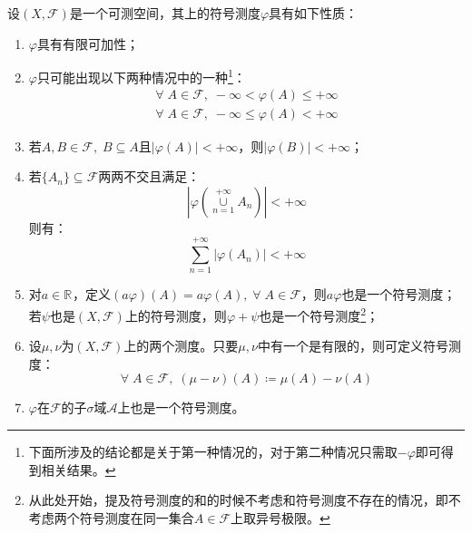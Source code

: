 \begin{property}\label{prop:SignedMeasure}
	设$(X,\mathscr{F})$是一个可测空间，其上的符号测度$\varphi$具有如下性质：
	\begin{enumerate}
		\item $\varphi$具有有限可加性；
		\item $\varphi$只可能出现以下两种情况中的一种\footnote{下面所涉及的结论都是关于第一种情况的，对于第二种情况只需取$-\varphi$即可得到相关结果。}：
		\begin{gather*}
			\forall\;A\in\mathscr{F},\;-\infty<\varphi(A)\leqslant+\infty \\
			\forall\;A\in\mathscr{F},\;-\infty\leqslant\varphi(A)<+\infty
		\end{gather*}
		\item 若$A,B\in\mathscr{F},\;B\subseteq A$且$|\varphi(A)|<+\infty$，则$|\varphi(B)|<+\infty$；
		\item 若$\{A_n\}\subseteq\mathscr{F}$两两不交且满足：
		\begin{equation*}
			\left|\varphi\left(\underset{n=1}{\overset{+\infty}{\cup}}A_n\right)\right|<+\infty
		\end{equation*}
		则有：
		\begin{equation*}
			\sum_{n=1}^{+\infty}|\varphi(A_n)|<+\infty
		\end{equation*}
		\item 对$a\in\mathbb{R}^{}$，定义$(a\varphi)(A)=a\varphi(A),\;\forall\;A\in\mathscr{F}$，则$a\varphi$也是一个符号测度；若$\psi$也是$(X,\mathscr{F})$上的符号测度，则$\varphi+\psi$也是一个符号测度\footnote{从此处开始，提及符号测度的和的时候不考虑和符号测度不存在的情况，即不考虑两个符号测度在同一集合$A\in\mathscr{F}$上取异号极限。}；
		\item 设$\mu,\nu$为$(X,\mathscr{F})$上的两个测度。只要$\mu,\nu$中有一个是有限的，则可定义符号测度：
		\begin{equation*}
			\forall\;A\in\mathscr{F},\;(\mu-\nu)(A)\coloneq\mu(A)-\nu(A)
		\end{equation*}
		\item $\varphi$在$\mathscr{F}$的子$\sigma$域$\mathscr{A}$上也是一个符号测度。
	\end{enumerate}
\end{property}
